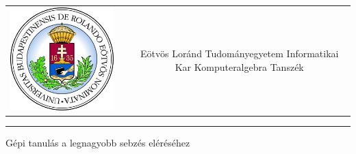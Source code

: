\documentclass[12pt]{article}
\begin{document}
	
	\begin{titlepage}
		\vspace*{0cm}
		\centering
		\begin{tabular}{cp{1cm}c}
			\begin{minipage}{4cm}
				\vspace{0pt}
				\includegraphics[width=1\textwidth]{elte_cimer}
			\end{minipage} & &
			\begin{minipage}{7cm}
				\vspace{0pt}Eötvös Loránd Tudományegyetem \vspace{10pt} \newline
				Informatikai Kar \vspace{10pt} \newline
				Komputeralgebra Tanszék
			\end{minipage}
		\end{tabular}
		
		\vspace*{0.2cm}
		\rule{\textwidth}{1pt}
		
		\vspace*{4cm}
		{\huge Gépi tanulás a legnagyobb sebzés eléréséhez }
		
		\vspace*{9cm}
		

\end{titlepage}
\end{document}
